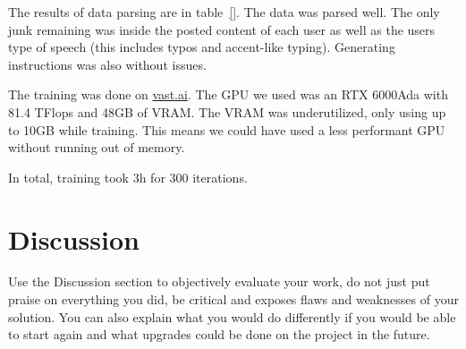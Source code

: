 \documentclass[fleqn,moreauthors,10pt]{ds_report}
\begin{document}
The results of data parsing are in table~\ref{}. The data was parsed well. The only junk remaining was inside the posted content of each user as well as the users type of speech (this includes typos and accent-like typing). Generating instructions was also without issues.

The training was done on \href{https://cloud.vast.ai/create/}{vast.ai}. The GPU we used was an RTX 6000Ada with 81.4 TFlops and 48GB of VRAM. The VRAM was underutilized, only using up to 10GB while training. This means we could have used a less performant GPU without running out of memory.

In total, training took 3h for 300 iterations.

\section*{Discussion}

Use the Discussion section to objectively evaluate your work, do not just put praise on everything you did, be critical and exposes flaws and weaknesses of your solution. You can also explain what you would do differently if you would be able to start again and what upgrades could be done on the project in the future.

\printbibliography
%
%
\end{document}
